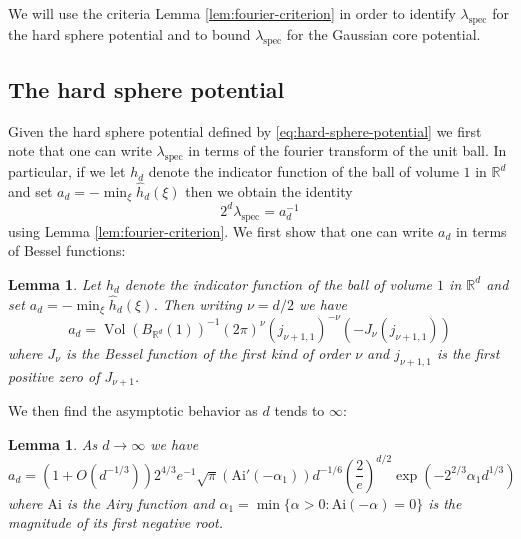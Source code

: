 \documentclass[10pt]{amsart}
\newtheorem{lemma}[theorem]{Lemma}
\theoremstyle{definition}
\theoremstyle{remark}
\newcommand{\spec}{{\mathrm{spec}}}
\newcommand{\Vol}{\operatorname{Vol}}
\newcommand{\R}{\mathbb{R}}
\begin{document}
	
	We will use the criteria Lemma \ref{lem:fourier-criterion} in order to identify $\lambda_\spec$ for the hard sphere potential and to bound $\lambda_\spec$ for the Gaussian core potential.
	
	\subsection{The hard sphere potential} \label{sec:lambda-spec-HS}
	
	Given the hard sphere potential defined by \eqref{eq:hard-sphere-potential} we first note that one can write $\lambda_\spec$ in terms of the fourier transform of the unit ball.  In particular, if we let $h_d$ denote the indicator function of the ball of volume $1$ in $\R^d$ and set $a_d = - \min_{\xi} \widehat{h}_d(\xi)$ then we obtain the identity \begin{equation} \label{eq:hard-sphere-in-terms-unit-ball}
		2^d\lambda_\spec = a_d^{-1}
	\end{equation}
	using Lemma \ref{lem:fourier-criterion}.  We first show that one can write $a_d$ in terms of Bessel functions:
	
	\begin{lemma}\label{lem:unit-ball-fourier}
		Let $h_d$ denote the indicator function of the ball of volume $1$ in $\R^d$ and set $a_d = - \min_{\xi} \widehat{h}_d(\xi)$.  Then writing $\nu = d/2$ we have
		\begin{equation}
			a_d = \Vol(B_{\R^d}(1))^{-1} (2\pi)^{\nu} ( j_{\nu + 1,1})^{-\nu} (-J_{\nu}(j_{\nu + 1,1}))
		\end{equation}
		where $J_\nu$ is the Bessel function of the first kind of order $\nu$ and $j_{\nu+1,1}$ is the first positive zero of $J_{\nu+1}$.  
	\end{lemma}
	
	We then find the asymptotic behavior as $d$ tends to $\infty$:
	
	\begin{lemma}\label{lem:asymptotics-fourier-ball}
		As $d \to \infty$ we have
		\begin{equation*}
			a_d  = (1 + O(d^{-1/3})) 2^{4/3}e^{-1}\sqrt{\pi} (\mathrm{Ai}'(-\alpha_1)) d^{-1/6}\left(\frac{2}{e} \right)^{d/2} \exp(-2^{2/3} \alpha_1 d^{1/3})
		\end{equation*}
		where $\mathrm{Ai}$ is the Airy function and $\alpha_1 = \min\{\alpha  > 0: \mathrm{Ai}(-\alpha) = 0\}$ is the magnitude of its first negative root.
	\end{lemma}
	
\end{document}
